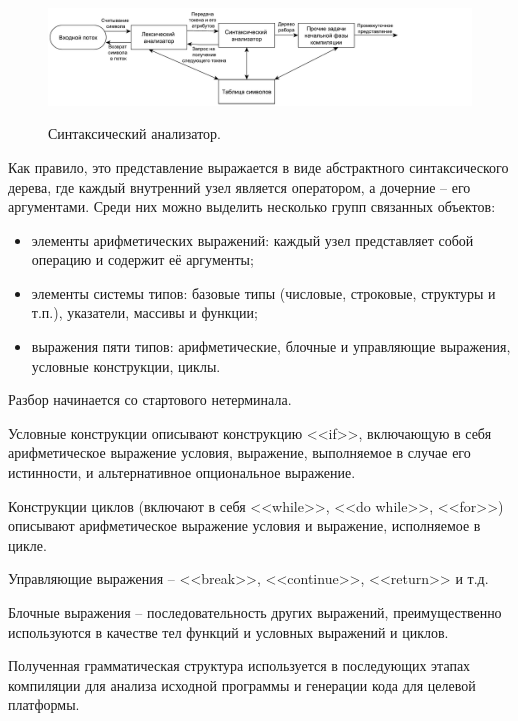 \begin{figure}[h!]
	\begin{center}
		{\includegraphics[scale = 0.55, page=1]{img/parser.pdf}}
		\caption{Синтаксический анализатор.}
		\label{fig:parser}
	\end{center}
\end{figure} 

Как правило, это представление выражается в виде абстрактного синтаксического дерева, где каждый внутренний узел является оператором, а дочерние -- его аргументами. Среди них можно выделить несколько групп связанных объектов:
\begin{itemize}
	\item элементы арифметических выражений: каждый узел представляет собой операцию и содержит её аргументы;
	
	\item элементы системы типов: базовые типы (числовые, строковые, структуры и т.п.), указатели, массивы и функции;
	 
	\item выражения пяти типов: арифметические, блочные и управляющие выражения, условные конструкции, циклы.
\end{itemize}

Разбор начинается со стартового нетерминала. 

Условные конструкции описывают конструкцию <<if>>, включающую в себя арифметическое выражение условия, выражение, выполняемое в случае его истинности, и альтернативное опциональное выражение.

Конструкции циклов (включают в себя <<while>>, <<do while>>, <<for>>) описывают арифметическое выражение условия и выражение, исполняемое в цикле.

Управляющие выражения -- <<break>>, <<continue>>, <<return>> и т.д. 

Блочные выражения -- последовательность других выражений, преимущественно используются в качестве тел функций и условных выражений и циклов.

Полученная грамматическая структура используется в последующих этапах компиляции для анализа исходной программы и генерации кода для целевой платформы. 

